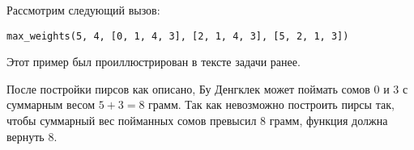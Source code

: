 Рассмотрим следующий вызов:

\texttt{max\_weights(5, 4, [0, 1, 4, 3], [2, 1, 4, 3], [5, 2, 1, 3])}

Этот пример был проиллюстрирован в тексте задачи ранее.

После постройки пирсов как описано, Бу Денгклек может поймать сомов $0$ и $3$ с суммарным весом $5 + 3 = 8$ грамм.
Так как невозможно построить пирсы так, чтобы суммарный вес пойманных сомов превысил $8$ грамм, функция должна вернуть $8$.